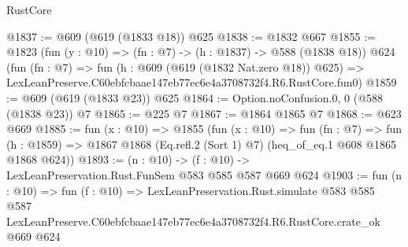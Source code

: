 \begin{lexlean}{RustCore}
\begin{coremodule}
@1837 := @609 (@619 (@1833 @18)) @625
@1838 := @1832 @667
@1855 := @1823
    (fun (y : @10) => (fn : @7) -> (h : @1837) -> @588 (@1838 @18))
    @624
    (fun (fn : @7) =>
    fun (h : @609 (@619 (@1832 Nat.zero @18)) @625) =>
    LexLeanPreserve.C60ebfcbaae147eb77ec6e4a3708732f4.R6.RustCore.fun0)
@1859 := @609 (@619 (@1833 @23)) @625
@1864 := Option.noConfusion.{0, 0} (@588 (@1838 @23)) @7
@1865 := @225 @7
@1867 := @1864 @1865 @7
@1868 := @623 @669
@1885 := fun (x : @10) =>
  @1855
    (fun (x : @10) =>
    fun (fn : @7) =>
    fun (h : @1859) => @1867 @1868 (Eq.refl.{2} (Sort 1) @7) (heq_of_eq.{1} @608 @1865 @1868 @624))
@1893 := (n : @10) -> (f : @10) -> LexLeanPreservation.Rust.FunSem @583 @585 @587 @669 @624
@1903 := fun (n : @10) =>
  fun (f : @10) =>
  LexLeanPreservation.Rust.simulate
    @583
    @585
    @587
    LexLeanPreserve.C60ebfcbaae147eb77ec6e4a3708732f4.R6.RustCore.crate_ok
    @669
    @624
\end{coremodule}
\end{lexlean}
